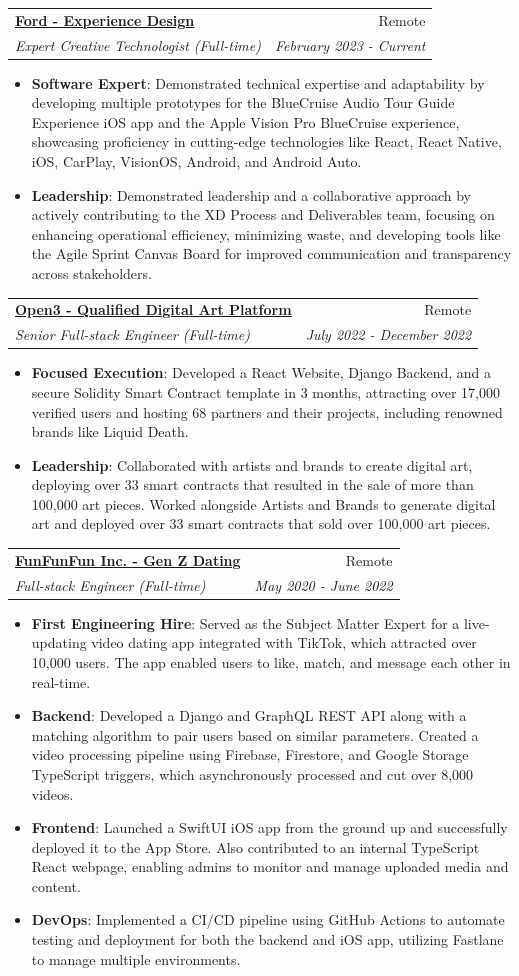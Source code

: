 \documentclass[a4paper,20pt]{article}
\makeatletter
\newcommand{\resumeItem}[2]{
  \item\small{
    \textbf{#1}{: #2 \vspace{-2pt}}
  }
}
\newcommand{\resumeSubheading}[4]{
  \vspace{-1pt}\item
    \begin{tabular*}{0.97\textwidth}{l@{\extracolsep{\fill}}r}
      \textbf{#1} & #2 \\
      \textit{#3} & \textit{#4} \\
    \end{tabular*}\vspace{-5pt}
}
\newcommand{\resumeItemListStart}{\begin{itemize}}
\newcommand{\resumeItemListEnd}{\end{itemize}\vspace{-5pt}}
\makeatother
\begin{document}
  \resumeSubheading{\underline{\href{http://ford.com}{Ford - Experience Design}}}{Remote}
    {Expert Creative Technologist (Full-time)}{February 2023 - Current}
    \resumeItemListStart
          \resumeItem{Software Expert}
          {Demonstrated technical expertise and adaptability by developing multiple prototypes for the BlueCruise Audio Tour Guide Experience iOS app and the Apple Vision Pro BlueCruise experience, showcasing proficiency in cutting-edge technologies like React, React Native, iOS, CarPlay, VisionOS, Android, and Android Auto.}
          \resumeItem{Leadership}
          {Demonstrated leadership and a collaborative approach by actively contributing to the XD Process and Deliverables team, focusing on enhancing operational efficiency, minimizing waste, and developing tools like the Agile Sprint Canvas Board for improved communication and transparency across stakeholders.}
          \resumeItemListEnd

  \resumeSubheading{\underline{\href{http://open3.com}{Open3 - Qualified Digital Art Platform}}}{Remote}
    {Senior Full-stack Engineer (Full-time)}{July 2022 - December 2022}
    \resumeItemListStart
          \resumeItem{Focused Execution}
          {Developed a React Website, Django Backend, and a secure Solidity Smart Contract template in 3 months, attracting over 17,000 verified users and hosting 68 partners and their projects, including renowned brands like Liquid Death.}
          \resumeItem{Leadership}
          {Collaborated with artists and brands to create digital art, deploying over 33 smart contracts that resulted in the sale of more than 100,000 art pieces. Worked alongside Artists and Brands to generate digital art and deployed over 33 smart contracts that sold over 100,000 art pieces.}
          \resumeItemListEnd

          \resumeSubheading{\underline{\href{http://funfunfun.app}{FunFunFun Inc. - Gen Z Dating}}}{Remote}
    {Full-stack Engineer (Full-time)}{May 2020 - June 2022}
    \resumeItemListStart
        \resumeItem{First Engineering Hire}
          {Served as the Subject Matter Expert for a live-updating video dating app integrated with TikTok, which attracted over 10,000 users. The app enabled users to like, match, and message each other in real-time.}
          \resumeItem{Backend}
          {Developed a Django and GraphQL REST API along with a matching algorithm to pair users based on similar parameters. Created a video processing pipeline using Firebase, Firestore, and Google Storage TypeScript triggers, which asynchronously processed and cut over 8,000 videos.}
          \resumeItem{Frontend}
          {Launched a SwiftUI iOS app from the ground up and successfully deployed it to the App Store. Also contributed to an internal TypeScript React webpage, enabling admins to monitor and manage uploaded media and content.}
          \resumeItem{DevOps}
          {Implemented a CI/CD pipeline using GitHub Actions to automate testing and deployment for both the backend and iOS app, utilizing Fastlane to manage multiple environments.}
      \resumeItemListEnd
\end{document}
